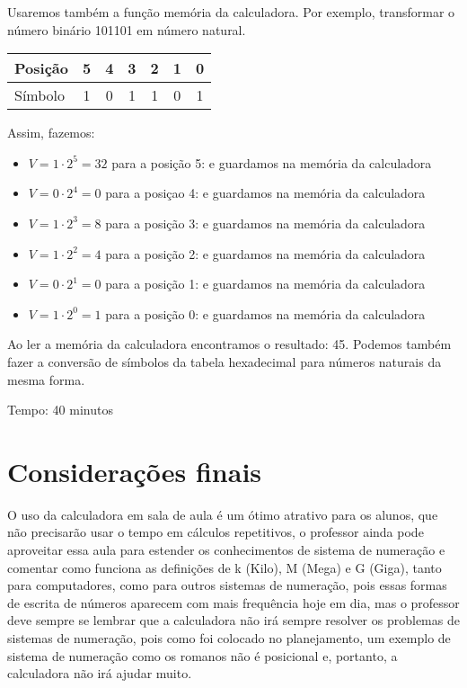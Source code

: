 \documentclass[12pt, openright, a4paper, brazil, openany, oneside]{abntex2}
\begin{document}
Usaremos também a função memória da calculadora. Por exemplo, transformar o número binário 101101 em número natural.

\begin{table}[h]
        \centering
        \begin{tabular}{|l|c|c|c|c|c|c|}
            \hline
            Posição & 5 & 4 & 3 & 2 & 1 & 0 \\
            \hline
            Símbolo & 1 & 0 & 1 & 1 & 0 & 1 \\
            \hline
        \end{tabular}
    \end{table}


Assim, fazemos:

\begin{itemize}
    \item $V=1 \cdot 2^5=32 $ para a posição 5: e guardamos na memória da calculadora
    \item $V=0 \cdot 2^4=0 $ para a posiçao 4: e guardamos na memória da calculadora
    \item $V=1 \cdot 2^3=8 $ para a posição 3: e guardamos na memória da calculadora
    \item $V=1 \cdot 2^2=4 $ para a posição 2: e guardamos na memória da calculadora
    \item $V=0 \cdot 2^1=0 $ para a posição 1: e guardamos na memória da calculadora
    \item $V=1 \cdot 2^0=1 $ para a posição 0: e guardamos na memória da calculadora
\end{itemize}

Ao ler a memória da calculadora encontramos o resultado: 45.
Podemos também fazer a conversão de símbolos da tabela hexadecimal para números naturais da mesma forma.

Tempo: 40 minutos



\chapter{Considerações finais}

O uso da calculadora em sala de aula é um ótimo atrativo para os alunos, que não precisarão usar o tempo em cálculos repetitivos, o professor ainda pode aproveitar essa aula para estender os conhecimentos de sistema de numeração e comentar como funciona as definições de k (Kilo), M (Mega) e G (Giga), tanto para computadores, como para outros sistemas de numeração, pois essas formas de escrita de números aparecem com mais frequência hoje em dia, mas o professor deve sempre se lembrar que a calculadora não irá sempre resolver os problemas de sistemas de numeração, pois como foi colocado no planejamento, um exemplo de sistema de numeração como os romanos não é posicional e, portanto, a calculadora não irá ajudar muito. 
\end{document}

